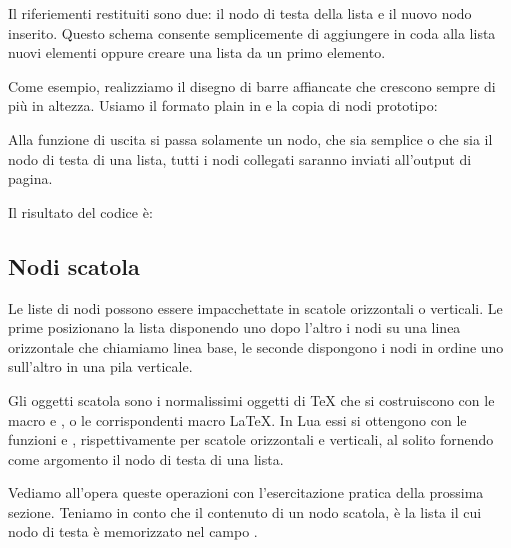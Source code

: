 Il riferiementi restituiti sono due: il nodo di testa della lista e il nuovo
nodo inserito. Questo schema consente semplicemente di aggiungere in coda alla
lista nuovi elementi oppure creare una lista da un primo elemento.

Come esempio, realizziamo il disegno di barre affiancate che crescono sempre di
più in altezza. Usiamo il formato plain in \LuaTeX{} e la copia di nodi
prototipo:

Alla funzione di uscita  si passa solamente un nodo, che sia
semplice o che sia il nodo di testa di una lista, tutti i nodi collegati saranno
inviati all'output di pagina.

Il risultato del codice è: 


\subsection{Nodi scatola}

Le liste di nodi possono essere impacchettate in scatole orizzontali o
verticali. Le prime posizionano la lista disponendo uno dopo l'altro i nodi su
una linea orizzontale che chiamiamo linea base, le seconde dispongono i nodi in
ordine uno sull'altro in una pila verticale.

Gli oggetti scatola sono i normalissimi oggetti di \TeX{} che si costruiscono
con le macro  e , o le corrispondenti macro \LaTeX. In Lua
essi si ottengono con le funzioni  e
, rispettivamente per scatole orizzontali e
verticali, al solito fornendo come argomento il nodo di testa di una lista.

Vediamo all'opera queste operazioni con l'esercitazione pratica della prossima
sezione. Teniamo in conto che il contenuto di un nodo scatola, è la lista il cui
nodo di testa è memorizzato nel campo .


